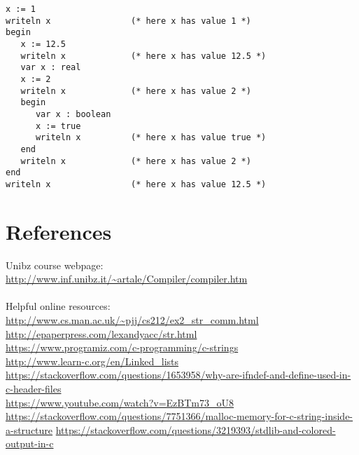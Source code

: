 \documentclass[12pt]{article}
\begin{document}
\begin{lstlisting}[frame=single]
x := 1
writeln x                (* here x has value 1 *)
begin
   x := 12.5
   writeln x             (* here x has value 12.5 *)
   var x : real
   x := 2
   writeln x             (* here x has value 2 *)
   begin
      var x : boolean
      x := true
      writeln x          (* here x has value true *)
   end
   writeln x             (* here x has value 2 *)
end
writeln x                (* here x has value 12.5 *)
\end{lstlisting}
\vspace{1.5cm}




\section{References}
Unibz course webpage:\\
\url{http://www.inf.unibz.it/~artale/Compiler/compiler.htm}\\\\
Helpful online resources:\\
\url{http://www.cs.man.ac.uk/~pjj/cs212/ex2_str_comm.html}\\
\url{http://epaperpress.com/lexandyacc/str.html}\\
\url{https://www.programiz.com/c-programming/c-strings}\\
\url{http://www.learn-c.org/en/Linked_lists}\\
\url{https://stackoverflow.com/questions/1653958/why-are-ifndef-and-define-used-in-c-header-files}\\
\url{https://www.youtube.com/watch?v=EzBTm73_oU8}\\
\url{https://stackoverflow.com/questions/7751366/malloc-memory-for-c-string-inside-a-structure}
\url{https://stackoverflow.com/questions/3219393/stdlib-and-colored-output-in-c}




\end{document}
